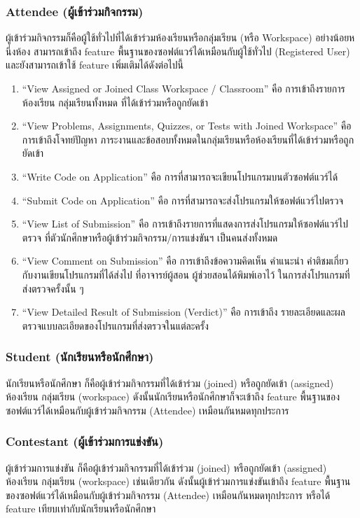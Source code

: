 \documentclass[12pt,oneside,openright,a4paper]{cpe-thai-project}
\begin{document}
        \subsubsection{Attendee (ผู้เข้าร่วมกิจกรรม)}
        ผู้เข้าร่วมกิจกรรมก็คือผู้ใช้ทั่วไปที่ได้เข้าร่วมห้องเรียนหรือกลุ่มเรียน (หรือ Workspace) อย่างน้อยหนึ่งห้อง สามารถเข้าถึง feature พื้นฐานของซอฟต์แวร์ได้เหมือนกับผู้ใช้ทั่วไป (Registered User) และยังสามารถเข้าใช้ feature เพิ่มเติมได้ดังต่อไปนี้
        \begin{enumerate}
            \item “View Assigned or Joined Class Workspace / Classroom” คือ การเข้าถึงรายการห้องเรียน กลุ่มเรียนทั้งหมด ที่ได้เข้าร่วมหรือถูกยัดเข้า
            \item “View Problems, Assignments, Quizzes, or Tests with Joined Workspace” คือการเข้าถึงโจทย์ปัญหา ภาระงานและข้อสอบทั้งหมดในกลุ่มเรียนหรือห้องเรียนที่ได้เข้าร่วมหรือถูกยัดเข้า
            \item “Write Code on Application” คือ การที่สามารถจะเขียนโปรแกรมบนตัวซอฟต์แวร์ได้
            \item “Submit Code on Application” คือ การที่สามารถจะส่งโปรแกรมให้ซอฟต์แวร์ไปตรวจ
            \item “View List of Submission” คือ การเข้าถึงรายการที่แสดงการส่งโปรแกรมให้ซอฟต์แวร์ไปตรวจ ที่ตัวนักศึกษาหรือผู้เข้าร่วมกิจกรรม/การแข่งขันฯ เป็นคนส่งทั้งหมด
            \item “View Comment on Submission” คือ การเข้าถึงข้อความคิดเห็น คำแนะนำ คำติชมเกี่ยวกับงานเขียนโปรแกรมที่ได้ส่งไป ที่อาจารย์ผู้สอน ผู้ช่วยสอนได้พิมพ์เอาไว้ ในการส่งโปรแกรมที่ส่งตรวจครั้งนั้น ๆ
            \item “View Detailed Result of Submission (Verdict)” คือ การเข้าถึง รายละเอียดและผลตรวจแบบละเอียดของโปรแกรมที่ส่งตรวจในแต่ละครั้ง
        \end{enumerate}
        
        \subsubsection{Student (นักเรียนหรือนักศึกษา)}
        นักเรียนหรือนักศึกษา ก็คือผู้เข้าร่วมกิจกรรมที่ได้เข้าร่วม (joined) หรือถูกยัดเข้า (assigned) ห้องเรียน กลุ่มเรียน (workspace) ดังนั้นนักเรียนหรือนักศึกษาก็จะเข้าถึง feature พื้นฐานของซอฟต์แวร์ได้เหมือนกับผู้เข้าร่วมกิจกรรม (Attendee) เหมือนกันหมดทุกประการ

        \subsubsection{Contestant (ผู้เข้าร่วมการแข่งขัน)}
        ผู้เข้าร่วมการแข่งขัน ก็คือผู้เข้าร่วมกิจกรรมที่ได้เข้าร่วม (joined) หรือถูกยัดเข้า (assigned) ห้องเรียน กลุ่มเรียน (workspace) เช่นเดียวกัน ดังนั้นผู้เข้าร่วมการแข่งขันเข้าถึง feature พื้นฐานของซอฟต์แวร์ได้เหมือนกับผู้เข้าร่วมกิจกรรม (Attendee) เหมือนกันหมดทุกประการ หรือได้ feature เทียบเท่ากับนักเรียนหรือนักศึกษา
        
\end{document}
